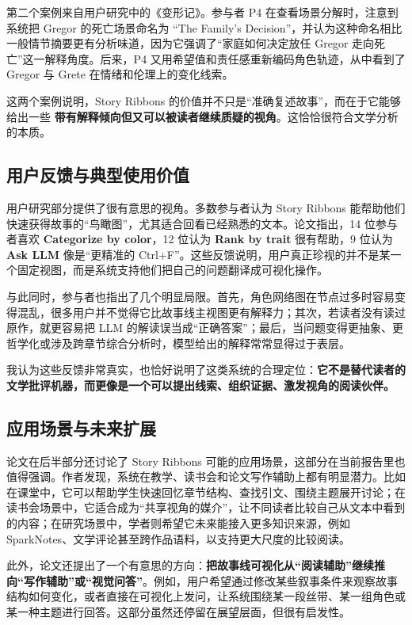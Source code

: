\documentclass[a4paper,12pt,UTF8]{article}
\begin{document}
第二个案例来自用户研究中的《变形记》。参与者 P4 在查看场景分解时，注意到系统把 Gregor 的死亡场景命名为 “The Family's Decision”，并认为这种命名相比一般情节摘要更有分析味道，因为它强调了“家庭如何决定放任 Gregor 走向死亡”这一解释角度。后来，P4 又用希望值和责任感重新编码角色轨迹，从中看到了 Gregor 与 Grete 在情绪和伦理上的变化线索。

这两个案例说明，Story Ribbons 的价值并不只是“准确复述故事”，而在于它能够给出一些 \textbf{带有解释倾向但又可以被读者继续质疑的视角}。这恰恰很符合文学分析的本质。

\subsection{用户反馈与典型使用价值}
用户研究部分提供了很有意思的视角。多数参与者认为 Story Ribbons 能帮助他们快速获得故事的“鸟瞰图”，尤其适合回看已经熟悉的文本。论文指出，14 位参与者喜欢 \textbf{Categorize by color}，12 位认为 \textbf{Rank by trait} 很有帮助，9 位认为 \textbf{Ask LLM} 像是“更精准的 Ctrl+F”。这些反馈说明，用户真正珍视的并不是某一个固定视图，而是系统支持他们把自己的问题翻译成可视化操作。

与此同时，参与者也指出了几个明显局限。首先，角色网络图在节点过多时容易变得混乱，很多用户并不觉得它比故事线主视图更有解释力；其次，若读者没有读过原作，就更容易把 LLM 的解读误当成“正确答案”；最后，当问题变得更抽象、更哲学化或涉及跨章节综合分析时，模型给出的解释常常显得过于表层。

我认为这些反馈非常真实，也恰好说明了这类系统的合理定位：\textbf{它不是替代读者的文学批评机器，而更像是一个可以提出线索、组织证据、激发视角的阅读伙伴。}

\subsection{应用场景与未来扩展}
论文在后半部分还讨论了 Story Ribbons 可能的应用场景，这部分在当前报告里也值得强调。作者发现，系统在教学、读书会和论文写作辅助上都有明显潜力。比如在课堂中，它可以帮助学生快速回忆章节结构、查找引文、围绕主题展开讨论；在读书会场景中，它适合成为“共享视角的媒介”，让不同读者比较自己从文本中看到的内容；在研究场景中，学者则希望它未来能接入更多知识来源，例如 SparkNotes、文学评论甚至跨作品语料，以支持更大尺度的比较阅读。

此外，论文还提出了一个有意思的方向：\textbf{把故事线可视化从“阅读辅助”继续推向“写作辅助”或“视觉问答”}。例如，用户希望通过修改某些叙事条件来观察故事结构如何变化，或者直接在可视化上发问，让系统围绕某一段丝带、某一组角色或某一种主题进行回答。这部分虽然还停留在展望层面，但很有启发性。
\end{document}
